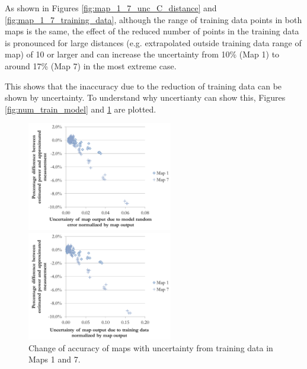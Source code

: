 As shown in Figures \ref{fig:map_1_7_unc_C_distance} and \ref{fig:map_1_7_training_data}, although the range of training data points in both maps is the same, the effect of the reduced number of points in the training data is pronounced for large distances (e.g. extrapolated outside training data range of map) of 10\dgC{} or larger and can increase the uncertainty from 10\% (Map 1) to around 17\% (Map 7) in the most extreme case.

This shows that the inaccuracy due to the reduction of training data can be shown by uncertainty. To understand why uncertianty can show this, Figures \ref{fig:num_train_model} and \ref{fig:num_train_train} are plotted.

\begin{figure}[h]
\begin{minipage}{15pc}
\includegraphics[width=15pc]{num_train_model.pdf}
\caption{\label{fig:num_train_model}Change of accuracy of maps with uncertainty from model random error in Maps 1 and 7.}
\end{minipage}\hspace{2pc}%
\begin{minipage}{15pc}
\includegraphics[width=15pc]{num_train_train.pdf}
\caption{\label{fig:num_train_train}Change of accuracy of maps with uncertainty from training data in Maps 1 and 7.}
\end{minipage} 
\end{figure}

